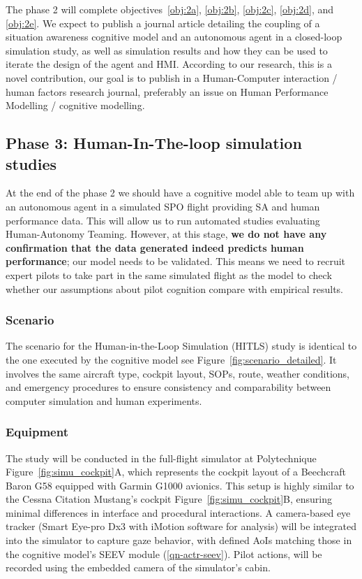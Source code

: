 \documentclass[12pt,a4paper]{article} %
\begin{document}
	The phase 2 will complete objectives~\ref{obj:2a}, \ref{obj:2b}, \ref{obj:2c}, \ref{obj:2d}, and \ref{obj:2e}. We expect to publish a journal article detailing the coupling of a situation awareness cognitive model and an autonomous agent in a closed-loop simulation study, as well as simulation results and how they can be used to iterate the design of the agent and HMI. According to our research, this is a novel contribution, our goal is to publish in a Human-Computer interaction / human factors research journal, preferably an issue on Human Performance Modelling / cognitive modelling.

	\subsection{Phase 3: Human-In-The-loop simulation studies}
	At the end of the phase 2 we should have a cognitive model able to team up with an autonomous agent in a simulated SPO flight providing SA and human performance data. This will allow us to run automated studies evaluating Human-Autonomy Teaming. However, at this stage, \textbf{we do not have any confirmation that the data generated indeed predicts human performance}; our model needs to be validated. This means we need to recruit expert pilots to take part in the same simulated flight as the model to check whether our assumptions about pilot cognition compare with empirical results.

	\subsubsection{Scenario}
	The scenario for the Human-in-the-Loop Simulation (HITLS) study is identical to the one executed by the cognitive model see Figure~\ref{fig:scenario_detailed}. It involves the same aircraft type, cockpit layout, SOPs, route, weather conditions, and emergency procedures to ensure consistency and comparability between computer simulation and human experiments.

	\subsubsection{Equipment}
	The study will be conducted in the full-flight simulator at Polytechnique Figure~\ref{fig:simu_cockpit}A, which represents the cockpit layout of a Beechcraft Baron G58 equipped with Garmin G1000 avionics. This setup is highly similar to the Cessna Citation Mustang's cockpit Figure~\ref{fig:simu_cockpit}B, ensuring minimal differences in interface and procedural interactions. A camera-based eye tracker (Smart Eye-pro Dx3 with iMotion software for analysis) will be integrated into the simulator to capture gaze behavior, with defined AoIs matching those in the cognitive model's SEEV module (\ref{qn-actr-seev}). Pilot actions, will be recorded using the embedded camera of the simulator's cabin.
\end{document}
